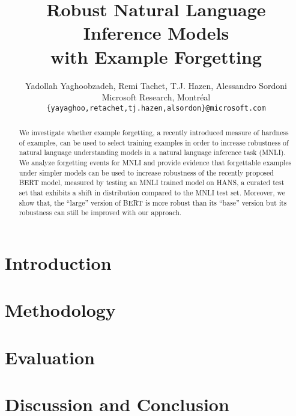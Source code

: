 \documentclass[11pt,a4paper]{article}
\title{Robust Natural Language Inference Models \\ with Example Forgetting}
\author{%
  Yadollah Yaghoobzadeh, Remi Tachet, T.J. Hazen, Alessandro Sordoni \\
  Microsoft Research, Montr\'eal \\
  \small \texttt{\{yayaghoo,retachet,tj.hazen,alsordon\}@microsoft.com}
}
\begin{document}
\maketitle

\begin{abstract}
We investigate whether example forgetting, a recently introduced measure of hardness of examples, can be used to select training examples in order to increase robustness of natural language understanding models in a natural language inference task (MNLI). We analyze forgetting events for MNLI and provide evidence that forgettable examples under simpler models can be used to increase robustness of the recently proposed BERT model, measured by testing an MNLI trained model on HANS, a curated test set that exhibits a shift in distribution compared to the MNLI test set. Moreover, we show that, the ``large'' version of BERT is more robust than its ``base'' version but its robustness can still be improved with our approach.
\end{abstract}

\section{Introduction}


\section{Methodology}


\section{Evaluation}
\label{sec:eval}



\iffalse
\section{Analysis}

\fi

\section{Discussion and Conclusion}





\appendix
\label{sec:detailedresults}

\end{document}
